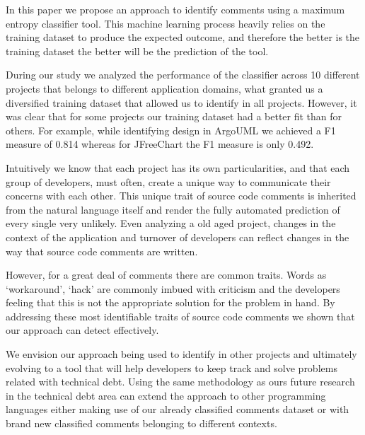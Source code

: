 In this paper we propose an approach to identify \SATD comments using a maximum entropy classifier tool. This machine learning process heavily relies on the training dataset to produce the expected outcome, and therefore the better is the training dataset the better will be the prediction of the tool. 

During our study we analyzed the performance of the classifier across 10 different projects that belongs to different application domains, what granted us a diversified training dataset that allowed us to identify \SATD in all projects. However, it was clear that for some projects our training dataset had a better fit than for others. For example, while identifying design \SATD in ArgoUML we achieved a F1 measure of 0.814 whereas for JFreeChart the F1 measure is only 0.492. 

Intuitively we know that each project has its own particularities, and that each group of developers, must often, create a unique way to communicate their concerns with each other. This unique trait of source code comments is inherited from the natural language itself and render the fully automated prediction of every single \SATD very unlikely. Even analyzing a old aged project, changes in the context of the application and turnover of developers can reflect changes in the way that source code comments are written. 

However, for a great deal of \SATD comments there are common traits. Words as `workaround', `hack' are commonly imbued with criticism and the developers feeling that this is not the appropriate solution for the problem in hand. By addressing these most identifiable traits of source code comments we shown that our approach can detect \SATD effectively. 

We envision our approach being used to identify \SATD in other projects and ultimately evolving to a tool that will help developers to keep track and solve problems related with technical debt. Using the same methodology as ours future research in the technical debt area can extend the approach to other programming languages either making use of our already classified comments dataset or with brand new classified comments belonging to different contexts. 


